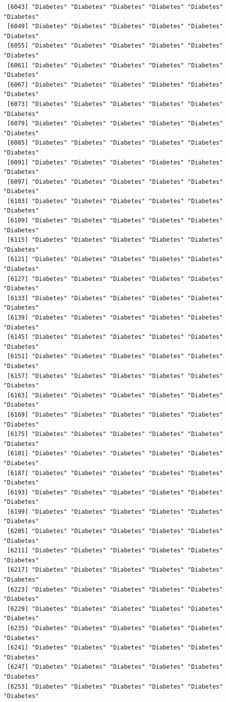 \documentclass[
  letterpaper,
  DIV=11,
  numbers=noendperiod]{scrartcl}
\begin{document}
\begin{verbatim}
 [6043] "Diabetes" "Diabetes" "Diabetes" "Diabetes" "Diabetes" "Diabetes"
 [6049] "Diabetes" "Diabetes" "Diabetes" "Diabetes" "Diabetes" "Diabetes"
 [6055] "Diabetes" "Diabetes" "Diabetes" "Diabetes" "Diabetes" "Diabetes"
 [6061] "Diabetes" "Diabetes" "Diabetes" "Diabetes" "Diabetes" "Diabetes"
 [6067] "Diabetes" "Diabetes" "Diabetes" "Diabetes" "Diabetes" "Diabetes"
 [6073] "Diabetes" "Diabetes" "Diabetes" "Diabetes" "Diabetes" "Diabetes"
 [6079] "Diabetes" "Diabetes" "Diabetes" "Diabetes" "Diabetes" "Diabetes"
 [6085] "Diabetes" "Diabetes" "Diabetes" "Diabetes" "Diabetes" "Diabetes"
 [6091] "Diabetes" "Diabetes" "Diabetes" "Diabetes" "Diabetes" "Diabetes"
 [6097] "Diabetes" "Diabetes" "Diabetes" "Diabetes" "Diabetes" "Diabetes"
 [6103] "Diabetes" "Diabetes" "Diabetes" "Diabetes" "Diabetes" "Diabetes"
 [6109] "Diabetes" "Diabetes" "Diabetes" "Diabetes" "Diabetes" "Diabetes"
 [6115] "Diabetes" "Diabetes" "Diabetes" "Diabetes" "Diabetes" "Diabetes"
 [6121] "Diabetes" "Diabetes" "Diabetes" "Diabetes" "Diabetes" "Diabetes"
 [6127] "Diabetes" "Diabetes" "Diabetes" "Diabetes" "Diabetes" "Diabetes"
 [6133] "Diabetes" "Diabetes" "Diabetes" "Diabetes" "Diabetes" "Diabetes"
 [6139] "Diabetes" "Diabetes" "Diabetes" "Diabetes" "Diabetes" "Diabetes"
 [6145] "Diabetes" "Diabetes" "Diabetes" "Diabetes" "Diabetes" "Diabetes"
 [6151] "Diabetes" "Diabetes" "Diabetes" "Diabetes" "Diabetes" "Diabetes"
 [6157] "Diabetes" "Diabetes" "Diabetes" "Diabetes" "Diabetes" "Diabetes"
 [6163] "Diabetes" "Diabetes" "Diabetes" "Diabetes" "Diabetes" "Diabetes"
 [6169] "Diabetes" "Diabetes" "Diabetes" "Diabetes" "Diabetes" "Diabetes"
 [6175] "Diabetes" "Diabetes" "Diabetes" "Diabetes" "Diabetes" "Diabetes"
 [6181] "Diabetes" "Diabetes" "Diabetes" "Diabetes" "Diabetes" "Diabetes"
 [6187] "Diabetes" "Diabetes" "Diabetes" "Diabetes" "Diabetes" "Diabetes"
 [6193] "Diabetes" "Diabetes" "Diabetes" "Diabetes" "Diabetes" "Diabetes"
 [6199] "Diabetes" "Diabetes" "Diabetes" "Diabetes" "Diabetes" "Diabetes"
 [6205] "Diabetes" "Diabetes" "Diabetes" "Diabetes" "Diabetes" "Diabetes"
 [6211] "Diabetes" "Diabetes" "Diabetes" "Diabetes" "Diabetes" "Diabetes"
 [6217] "Diabetes" "Diabetes" "Diabetes" "Diabetes" "Diabetes" "Diabetes"
 [6223] "Diabetes" "Diabetes" "Diabetes" "Diabetes" "Diabetes" "Diabetes"
 [6229] "Diabetes" "Diabetes" "Diabetes" "Diabetes" "Diabetes" "Diabetes"
 [6235] "Diabetes" "Diabetes" "Diabetes" "Diabetes" "Diabetes" "Diabetes"
 [6241] "Diabetes" "Diabetes" "Diabetes" "Diabetes" "Diabetes" "Diabetes"
 [6247] "Diabetes" "Diabetes" "Diabetes" "Diabetes" "Diabetes" "Diabetes"
 [6253] "Diabetes" "Diabetes" "Diabetes" "Diabetes" "Diabetes" "Diabetes"

\end{verbatim}
\end{document}
